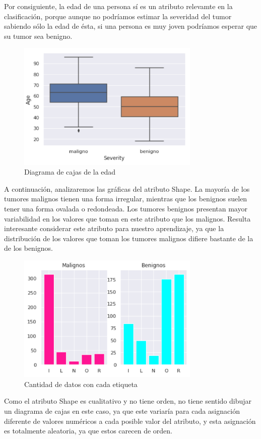\documentclass[a4]{article}
\begin{document}
Por consiguiente, la edad de una persona sí es un atributo relevamte en la clasificación, porque aunque no podríamos estimar la severidad del tumor sabiendo sólo la edad de ésta, si una persona es muy joven podríamos esperar que su tumor sea benigno. 

\begin{figure}[H]
  \centering
  \caption{Diagrama de cajas de la edad}
  \includegraphics[width=87mm]{imagenes/bp_age}
\end{figure}

A continuación, analizaremos las gráficas del atributo Shape. La mayoría de los tumores malignos tienen una forma irregular, mientras que los benignos suelen tener una forma ovalada o redondeada. Los tumores benignos presentan mayor variabilidad en los valores que toman en este atributo que los malignos. Resulta interesante considerar este atributo para nuestro aprendizaje, ya que la distribución de los valores que toman los tumores malignos difiere bastante de la de los benignos.\\

\begin{figure}[H]
  \centering
  \caption{Cantidad de datos con cada etiqueta}
  \includegraphics[width=87mm]{imagenes/shape}
\end{figure}

Como el atributo Shape es cualitativo y no tiene orden, no tiene sentido dibujar un diagrama de cajas en este caso, ya que este variaría para cada asignación diferente de valores numéricos a cada posible valor del atributo, y esta asignación es totalmente aleatoria, ya que estos carecen de orden.\\
\end{document}
